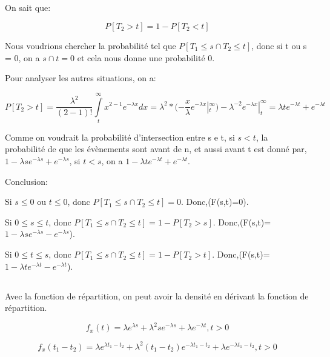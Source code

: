 \documentclass[a4paper]{article}
\begin{document}
\subsection{}

On sait que:

\begin{equation}
P[T_2 > t] =1 - P[T_2 < t]
\end{equation}

Nous voudrions  chercher la probabilité tel  que $P[T_1\leq s  \cap T_2\leq t]$,
donc si t ou s = 0, on a $s \cap t = 0$ et cela nous donne une probabilité 0.

Pour analyser les autres situations, on a:

\begin{equation*}
P[T_2 > t] = \frac{\lambda ^2}{(2 - 1)!}\int\limits_t^\infty{x^{2-1}}e^{-\lambda x}dx= \lambda ^2 *(-\frac{x}{\lambda} e^{-\lambda x} |_t^\infty)- \lambda^{-2} e^{-\lambda x}|_t^\infty = \lambda te^{-\lambda t} + e^{-\lambda t}
\end{equation*}

Comme  on voudrait  la probabilité  d'intersection  entre s  e t,  si $s<t$,  la
probabilité de que  les évènements sont avant  de n, et aussi avant  t est donné
par, $1 - \lambda se^{-\lambda s} + e^{-\lambda s}$, si $t<s$, on a 
$1 - \lambda te^{-\lambda t} + e^{-\lambda t}$.



Conclusion: 

Si $s \leq 0$ ou $t \leq 0$, donc $P[{T_1 \leq s} \cap {T_2 \leq t}]=0$. Donc,(F(s,t)=0).

Si $0 \leq s \leq t $, donc $P[{T_1 \leq s} \cap {T_2 \leq t}]=1-P[T_2 > s]$. Donc,(F(s,t)=$1 - \lambda se^{-\lambda s} - e^{-\lambda s}$).

Si $0 \leq t \leq s $, donc $P[{T_1 \leq s} \cap {T_2 \leq t}]=1-P[T_2 > t]$. Donc,(F(s,t)=$1 - \lambda te^{-\lambda t} - e^{-\lambda t}$).


\subsection{}
Avec la fonction de répartition, on  peut avoir la densité en dérivant la fonction
de répartition. 

\begin{equation}
f_x(t) = \lambda e^{\lambda s}+\lambda ^2se^{-\lambda s}+\lambda e^{-\lambda t} , t>0
\end{equation}

\begin{equation}
f_x(t_1-t_2) = \lambda e^{\lambda t_1-t_2}+\lambda ^2(t_1-t_2)e^{-\lambda t_1-t_2}+\lambda e^{-\lambda t_1-t_2} , t>0
\end{equation}



\end{document}

